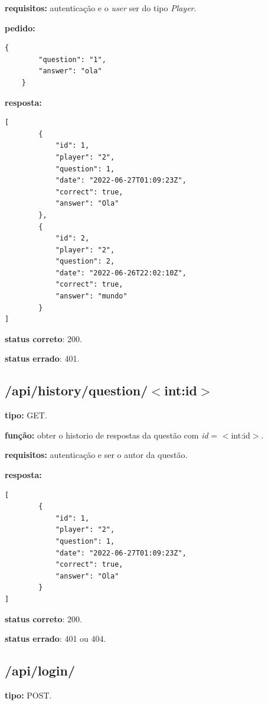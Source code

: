 \documentclass[11pt,a4paper]{report}
\begin{document}
\textbf{requisitos:} autenticação e o \emph{user} ser do tipo \emph{Player}.

\textbf{pedido:}
\begin{lstlisting}[style = code]
    {
        "question": "1",
        "answer": "ola"
    }
\end{lstlisting}

\textbf{resposta:}

\begin{lstlisting}[style = code]
    [
        {
            "id": 1,
            "player": "2",
            "question": 1,
            "date": "2022-06-27T01:09:23Z",
            "correct": true,
            "answer": "Ola"
        },
        {
            "id": 2,
            "player": "2",
            "question": 2,
            "date": "2022-06-26T22:02:10Z",
            "correct": true,
            "answer": "mundo"
        }
]
\end{lstlisting}

\textbf{status correto}: 200.

\textbf{status errado}: 401.

\newpage

\subsection{/api/history/question/$<$int:id$>$}

\textbf{tipo:} GET.

\textbf{função:} obter o historio de respostas da questão com \emph{id} = $<$int:id$>$.

\textbf{requisitos:} autenticação e ser o autor da questão.

\textbf{resposta:}

\begin{lstlisting}[style = code]
    [
        {
            "id": 1,
            "player": "2",
            "question": 1,
            "date": "2022-06-27T01:09:23Z",
            "correct": true,
            "answer": "Ola"
        }
]
\end{lstlisting}

\textbf{status correto}: 200.

\textbf{status errado}: 401 ou 404.

\subsection{/api/login/}

\textbf{tipo:} POST.
\end{document}

